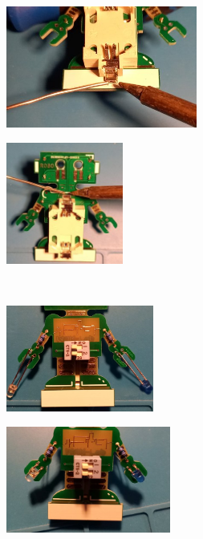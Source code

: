 \documentclass[a4paper]{article}
\begin{document}
\begin{minipage}[t]{0.33\textwidth}
  \centering
  \includegraphics[height=4cm]{../pictures/Bat2.jpg}
  \label{img:Bat2}
\end{minipage}
\begin{minipage}[t]{0.33\textwidth}
  \centering
  \includegraphics[height=4cm]{../pictures/Bat3.jpg}
  \label{img:Bat3}
\end{minipage}
\ \\
\begin{minipage}[t]{0.33\textwidth}
  \centering
  \includegraphics[height=3.5cm]{../pictures/LED1.jpg}
  \label{img:LED1}
  \end{minipage}
\begin{minipage}[t]{0.33\textwidth}
  \centering
  \includegraphics[height=3.5cm]{../pictures/LED2.jpg}
  \label{img:LED2}
\end{minipage}
\end{document}
